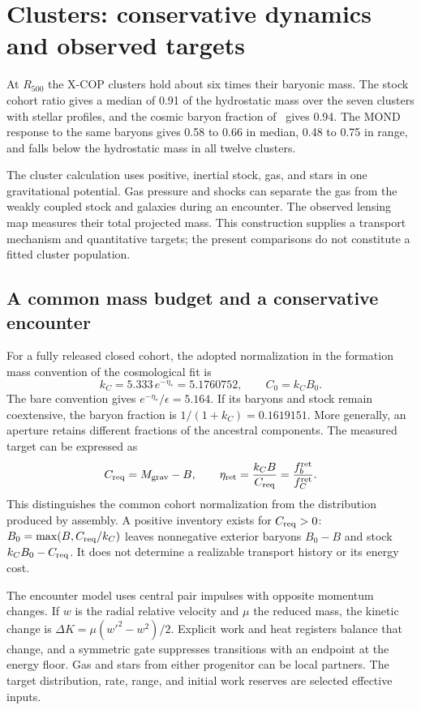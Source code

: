 \section{Clusters: conservative dynamics and observed targets}
\label{sec:clusters}

At $R_{500}$ the X-COP clusters hold about six times their baryonic mass.
The stock cohort ratio gives a median of 0.91 of the hydrostatic mass over
the seven clusters with stellar profiles, and the cosmic baryon fraction
of \LCDM\ gives 0.94. The MOND response to the same baryons gives 0.58
to 0.66 in median, 0.48 to 0.75 in range, and falls below the
hydrostatic mass in all twelve clusters.

The cluster calculation uses positive, inertial stock, gas, and stars in
one gravitational potential. Gas pressure and shocks can separate the
gas from the weakly coupled stock and galaxies during an encounter.
The observed lensing map measures their total projected mass. This
construction supplies a transport mechanism and quantitative targets;
the present comparisons do not constitute a fitted cluster population.

\subsection{A common mass budget and a conservative encounter}
For a fully released closed cohort, the adopted normalization in the
formation mass convention of the cosmological fit is
\begin{equation}
k_C=5.333\,e^{-\eta_*}=5.1760752,\qquad C_0=k_C B_0.
\end{equation}
The bare convention gives $e^{-\eta_*}/\epsilon=5.164$.
If its baryons and stock remain coextensive, the baryon fraction is
$1/(1+k_C)=0.1619151$. More generally, an aperture retains different
fractions of the ancestral components. The measured target can be
expressed as
\begin{equation}
C_{\rm req}=M_{\rm grav}-B,\qquad
\eta_{\rm ret}=\frac{k_C B}{C_{\rm req}}
=\frac{f_b^{\rm ret}}{f_C^{\rm ret}}.
\end{equation}
This distinguishes the common cohort normalization from the distribution
produced by assembly. A positive inventory exists for $C_{\rm req}>0$:
$B_0=\max(B,C_{\rm req}/k_C)$ leaves nonnegative exterior baryons
$B_0-B$ and stock $k_CB_0-C_{\rm req}$. It does not determine a
realizable transport history or its energy cost.

The encounter model uses central pair impulses with opposite momentum
changes. If $w$ is the radial relative velocity and $\mu$ the reduced
mass, the kinetic change is $\Delta K=\mu(w'^2-w^2)/2$. Explicit work
and heat registers balance that change, and a symmetric gate suppresses
transitions with an endpoint at the energy floor. Gas and stars from
either progenitor can be local partners. The target distribution, rate,
range, and initial work reserves are selected effective inputs.

